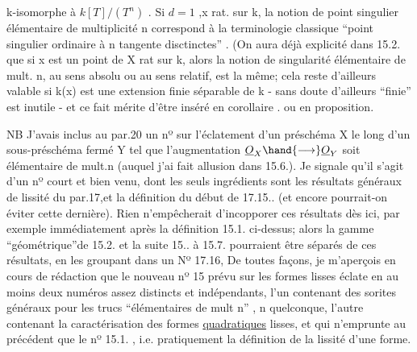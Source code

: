 
k-isomorphe à $k[T]/(T^n)$ . Si $d=1$ ,x rat. sur k, la notion de point singulier
 élémentaire de multiplicité n correspond à la terminologie
classique ``point singulier ordinaire à n tangente disctinctes'' .
\placedmargin{(}(On aura déjà explicité dans 15.2. que si x est un point de X rat sur k, alors
la notion de singularité élémentaire de mult. n, au sens absolu ou au
sens relatif,  est la même; cela reste d'ailleurs valable si k(x)
est une extension finie séparable de k - sans doute d'ailleurs ``finie''
est inutile - et ce fait mérite d'être inséré en corollaire .
ou en proposition\hand{)}.

NB J'avais inclus au par.20 un nº sur l'éclatement d'un
préschéma X le long d'un sous-préschéma fermé Y tel que l'augmentation
$\underline{O}_X \hand{\longrightarrow} \underline{O}_Y$ soit élémentaire de mult.n (auquel j'ai fait allusion dans
15.6.). Je signale qu'il s'agit d'un nº court et bien venu, dont les
seuls ingrédients sont les résultats généraux de lissité du par.17,et
la définition du début de 17.15.. (et encore pourrait-on éviter cette dernière). Rien n'empêcherait d'incopporer ces résultats
dès ici,  par exemple immédiatement après la définition
15.1. ci-dessus; alors la gamme ``géométrique''de 15.2. et la suite 15.. à 15.7. pourraient être séparés
de ces  résultats, en les groupant dans un Nº 17.16, 
 De toutes façons, je m'aperçois en cours de rédaction que le
\placedmargin{(}nouveau nº 15 prévu sur les formes lisses éclate en au moins deux numéros assez
distincts et indépendants, l'un contenant des sorites généraux pour
les trucs ``élémentaires de mult n'' , n quelconque, l'autre  contenant la
caractérisation des formes \uline{quadratiques} lisses, et qui n'emprunte au
précédent que le nº 15.1. , i.e. pratiquement la définition de la lissité
d'une forme.

